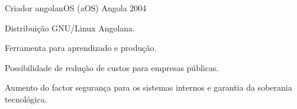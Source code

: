 \begin{cventries}

\cventry
{Criador} %
{angolanOS (aOS)} %
{Angola} %
{2004} %
{ %
\begin{cvitems}
\item {Distribuição GNU/Linux Angolana.}
\item {Ferramenta para aprendizado e produção.}
\item {Possibilidade de redução de custos para empresas públicas.}
\item {Aumento do factor segurança para os sistemas internos e garantia da soberania tecnológica.}
\end{cvitems}
}


\end{cventries}

